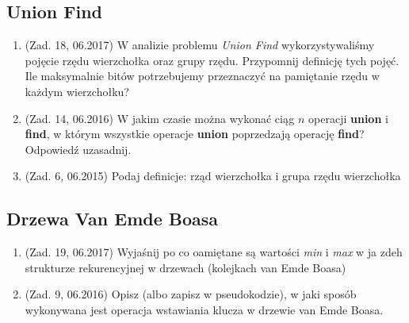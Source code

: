 \documentclass[10pt]{article}%
\begin{document}
\subsection*{Union Find}
\begin{enumerate}
\item (Zad. 18, 06.2017) W analizie problemu \emph{Union Find} wykorzystywaliśmy pojęcie rzędu wierzchołka oraz grupy rzędu. Przypomnij definicję tych pojęć. Ile maksymalnie bitów potrzebujemy przeznaczyć na pamiętanie rzędu w każdym wierzchołku?

\item (Zad. 14, 06.2016) W jakim czasie można wykonać ciąg $n$ operacji \textbf{union} i \textbf{find}, w którym wszystkie operacje \textbf{union} poprzedzają operację \textbf{find}? Odpowiedź uzasadnij.

\item (Zad. 6, 06.2015) Podaj definicje: rząd wierzchołka i grupa rzędu wierzchołka
\end{enumerate}
\subsection*{Drzewa Van Emde Boasa}
\begin{enumerate}
\item (Zad. 19, 06.2017) Wyjaśnij po co oamiętane są wartości \emph{min} i \emph{max} w ja zdeh strukturze rekurencyjnej w drzewach (kolejkach van Emde Boasa)

\item (Zad. 9, 06.2016) Opisz (albo zapisz w pseudokodzie), w jaki sposób wykonywana jest operacja wstawiania klucza w drzewie van Emde Boasa.
\end{enumerate}
\end{document}
